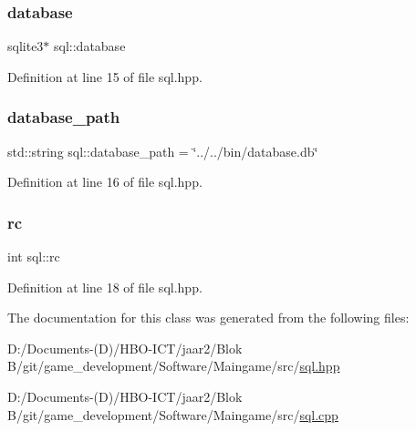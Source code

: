 \subsubsection{\texorpdfstring{database}{database}}
{\footnotesize\ttfamily sqlite3$\ast$ sql\+::database\hspace{0.3cm}{\ttfamily [private]}}



Definition at line 15 of file sql.\+hpp.

\mbox{\label{classsql_aa0b79c68df90d2e2a3f829e25a44b878}} 
\subsubsection{\texorpdfstring{database\+\_\+path}{database\_path}}
{\footnotesize\ttfamily std\+::string sql\+::database\+\_\+path = \char`\"{}../../bin/database.\+db\char`\"{}\hspace{0.3cm}{\ttfamily [private]}}



Definition at line 16 of file sql.\+hpp.

\mbox{\label{classsql_a1ad7137a182503f7676b53f6fa2786ed}} 
\subsubsection{\texorpdfstring{rc}{rc}}
{\footnotesize\ttfamily int sql\+::rc\hspace{0.3cm}{\ttfamily [private]}}



Definition at line 18 of file sql.\+hpp.



The documentation for this class was generated from the following files\+:\begin{DoxyCompactItemize}
\item 
D\+:/\+Documents-\/(\+D)/\+H\+B\+O-\/\+I\+C\+T/jaar2/\+Blok B/git/game\+\_\+development/\+Software/\+Maingame/src/\hyperlink{sql_8hpp}{sql.\+hpp}\item 
D\+:/\+Documents-\/(\+D)/\+H\+B\+O-\/\+I\+C\+T/jaar2/\+Blok B/git/game\+\_\+development/\+Software/\+Maingame/src/\hyperlink{sql_8cpp}{sql.\+cpp}\end{DoxyCompactItemize}
